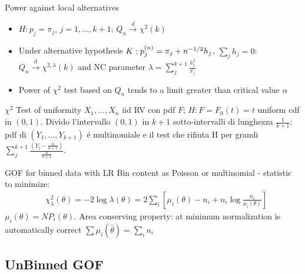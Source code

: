 \documentclass[asd-beamer.tex]{subfiles}%
\begin{document}
\begin{frame}{Power against local alternatives}
	\begin{itemize}
		\item $H: p_j=\pi_j$, $j=1,\ldots,k+1$: $Q_n\xrightarrow{d}\chi^2(k)$
		\item Under alternative hypothesis $K: p_j^{(n)}=\pi_j+n^{-1/2}h_j$, $\sum_jh_j=0$: $Q_n\xrightarrow{d}\chi^{2,\lambda}(k)$ and NC parameter $\lambda=\sum_j^{k+1}\frac{h_j^2}{\pi_j}$
		\item Power of $\chi^2$ test based on $Q_n$ tends to a limit greater than critical value $\alpha$
	\end{itemize}
\end{frame}

\begin{frame}{$\chi^2$ Test of uniformity}
$X_1,\ldots,X_n$ iid RV con pdf $F$; $H: F=F_0(t)=t$ uniform cdf in $(0,1)$. Divido l'intervallo $(0,1)$ in $k+1$ sotto-intervalli di lunghezza $\frac{1}{k+1}$: pdf di $(Y_1,\ldots,Y_{k+1})$ \'e multinomiale e il test che rifiuta H per grandi $\sum_j^{k+1}\frac{(Y_j-\frac{n}{k+1})}{\frac{n}{k+1}}$.
\end{frame}



\begin{frame}{GOF for binned data with LR}
Bin content as Poisson or multinomial - statistic to minimize:
\begin{align*}
&\chi^2_{\lambda}(\theta)=-2\log{\lambda(\theta)}=2\sum_i[\mu_i(\theta)-n_i+n_i\log{\frac{n_i}{\mu_i(\theta)}}]
\end{align*}
$\mu_i(\theta)=NP_i(\theta)$. Area conserving property: at minimum normalization is automatically correct $\sum\mu_i(\hat{\theta})=\sum_in_i$
\end{frame}

\subsection{UnBinned GOF}\label{unbinnedgof}
\end{document}
